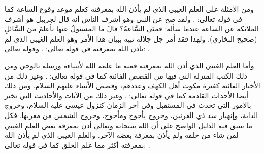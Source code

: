 ومن الأمثلة على العلم الغيبي الذي لم يأذن الله بمعرفته كعلم موعد وقوع الساعة كما في قوله تعالى: 
\quranayah*[33][63]{\footnotesize \surahname*[33]}.
ولقد صح عن النبي وهو أشرف الناس أنه قال لجربيل هو أشرف الملائكة عن الساعة عندما سأله: فمتَى السَّاعةُ؟ قالَ ما المسئولُ عنها بأعلمَ منَ السَّائلِ {\footnotesize (صحيح البخاري)}. ولهذا فقد أمر جل جلاله نبيه ببيان هذا الأمر وهو العلم الغيبي الذي لم يأذن الله بمعرفته في قوله تعالى:
\quranayah*[6][50]{\footnotesize \surahname*[6]}. وقوله تعالى:
\quranayah*[7][188]{\footnotesize \surahname*[7]}.

وأما العلم الغيبي الذي أذن الله بمعرفته فمنه ما علمه الله لأنبياءه ورسله بالوحي ومن ذلك الكتب المنزلة التي فيها من القصص الفائتة كما في قوله تعالى:
\quranayah*[11][49]{\footnotesize \surahname*[11]}. وغير ذلك من الأخبار الفائتة كفترة مكوث أهل الكهف وعددهم، وقصص الأنبياء عليهم السلام. ومن ذلك أيضا الأحداث القادمة كما في قوله تعالى:
\quranayah*[34][3]{\footnotesize \surahname*[34]}. وغير ذلك من الآيات والأحاديث التي تخبر بالأمور التي تحدث في المستقبل وفي آخر الزمان كنزول عيسى عليه السلام، وخروج الدابة، وإنهيار سد ذي القرنين، وخروج يأجوج ومأجوج، وخروج الشمس من مغربها. فكل ما سبق فيه الدليل الواضح على أن الله سبحانه وتعالى أذن بمعرفة بعض العلم الغيبي لمن شاء من خلقه ولم يأذن بمعرفة بعضه الآخر. والعلم الغيبي الذي لم يأذن الله بمعرفته أكثر مما علم الخلق كما في قوله تعالى: 
\quranayah*[17][85][9]{\footnotesize \surahname*[17]}. 

